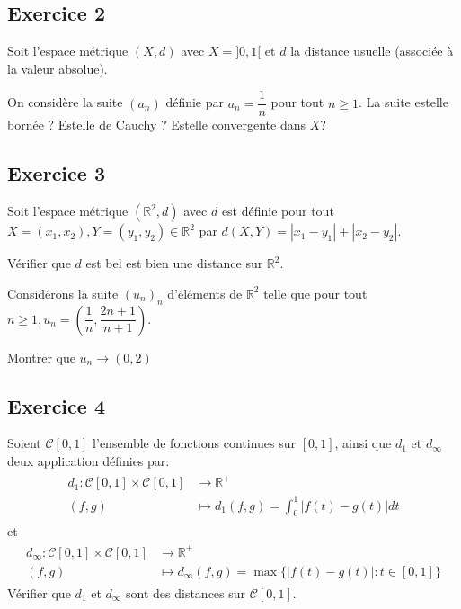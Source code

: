 \documentclass[letterpaper,10pt,french]{sphinxmanual}
\begin{document}
\subsection{Exercice 2}
\label{\detokenize{exo_fctplsvar:exercice-2}}
\sphinxAtStartPar
Soit l’espace métrique \((X, d)\) avec \(X =]0, 1[\) et \(d\) la distance usuelle (associée à la valeur absolue).

\sphinxAtStartPar
On considère la suite \((a_n)\) définie par \(a_n=\dfrac{1}{n}\) pour tout \(n\geq 1\). La suite est\sphinxhyphen{}elle bornée ? Est\sphinxhyphen{}elle de Cauchy ? Est\sphinxhyphen{}elle convergente dans \(X\)?


\subsection{Exercice 3}
\label{\detokenize{exo_fctplsvar:exercice-3}}
\sphinxAtStartPar
Soit l’espace métrique \((\mathbb R^2, d)\) avec \(d\) est définie pour tout \( X = (x_1, x_2), Y= (y_1, y_2) \in \mathbb R^2\) par \(d(X, Y) = |x_1 - y_1| + |x_2 - y_2|\).

\sphinxAtStartPar
Vérifier que \(d\) est bel est bien une distance sur \(\mathbb R^2\).

\sphinxAtStartPar
Considérons la suite \((u_n)_n\) d’éléments de \(\mathbb R^2\) telle que pour tout \(n \geq 1, u_n = (\dfrac{1}{n}, \dfrac{2n+1}{n+1})\).

\sphinxAtStartPar
Montrer que \(u_n \to (0, 2)\)


\subsection{Exercice 4}
\label{\detokenize{exo_fctplsvar:exercice-4}}
\sphinxAtStartPar
Soient \(\mathcal C [0, 1]\) l’ensemble de fonctions continues sur \([0, 1]\), ainsi que \(d_1\) et \(d_\infty\) deux application définies par:
\begin{equation*}
\begin{split}
\begin{aligned}
d_1 \colon \mathcal C [0, 1]\times \mathcal C [0, 1] &\to \mathbb R^+ \\
(f, g) &\mapsto d_1(f, g) = \int_0^1 |f(t)-g(t)| dt
\end{aligned}
\end{split}
\end{equation*}
\sphinxAtStartPar
et
\begin{equation*}
\begin{split}
\begin{aligned}
d_\infty \colon \mathcal C [0, 1]\times \mathcal C [0, 1] &\to \mathbb R^+ \\
(f, g) &\mapsto d_\infty(f, g) = \max\{|f(t)-g(t)|: t \in [0, 1]\}
\end{aligned}
\end{split}
\end{equation*}
\sphinxAtStartPar
Vérifier que \(d_1\) et \(d_\infty\) sont des distances sur \(\mathcal C [0, 1]\).
\end{document}
